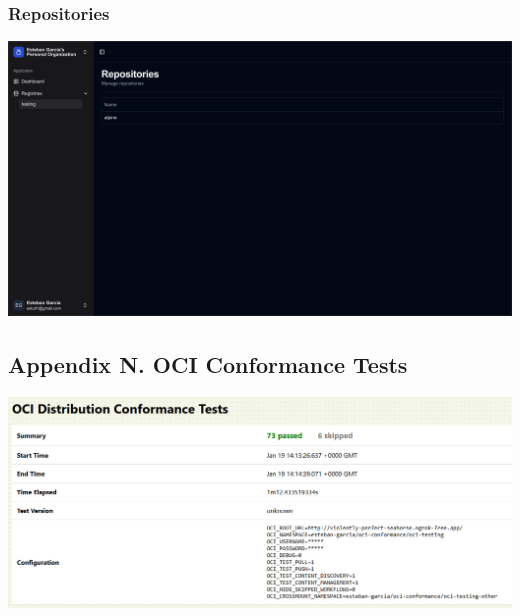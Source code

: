 \documentclass{article}
\begin{document}
  \subsubsection{Repositories}

  \includegraphics[scale=0.28]{screenshots/repositories.png}

  \subsection{Appendix N. OCI Conformance Tests}
  \label{sec:appendix-n}

  \includegraphics[scale=0.45]{appendix/oci-comformance-test.png}
\end{document}
